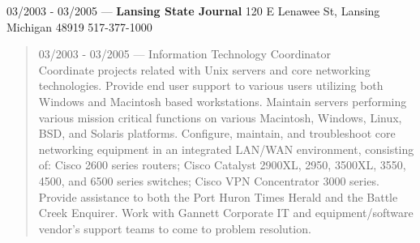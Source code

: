 03/2003 - 03/2005 --- {\bf Lansing State Journal} 120 E Lenawee St, Lansing Michigan 48919 517-377-1000
\begin{quote}
03/2003 - 03/2005 --- Information Technology Coordinator\\
Coordinate projects related with Unix servers and core networking technologies. Provide end user support to various users utilizing both Windows and Macintosh based workstations.  Maintain servers performing various mission critical functions on various Macintosh, Windows, Linux, BSD, and Solaris platforms. Configure, maintain, and troubleshoot core networking equipment in an integrated LAN/WAN environment, consisting of: Cisco 2600 series routers; Cisco Catalyst 2900XL, 2950, 3500XL, 3550, 4500, and 6500 series switches; Cisco VPN Concentrator 3000 series. Provide assistance to both the Port Huron Times Herald and the Battle Creek Enquirer. Work with Gannett Corporate IT and equipment/software vendor's support teams to come to problem resolution.
\end{quote}

